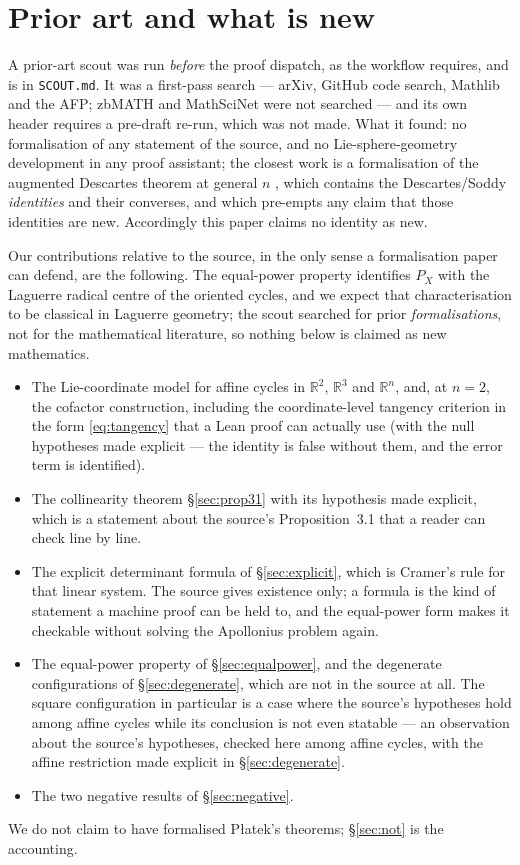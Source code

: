 \documentclass[11pt]{article}
\theoremstyle{definition}
\theoremstyle{remark}
\newcommand{\RR}{\mathbb{R}}
\begin{document}
\section{Prior art and what is new}\label{sec:prior}

A prior-art scout was run \emph{before} the proof dispatch, as the workflow requires, and is in
\texttt{SCOUT.md}. It was a first-pass search --- arXiv, GitHub code search,
Mathlib and the AFP; zbMATH and MathSciNet were not searched --- and its own header requires a
pre-draft re-run, which was not made. What it found: no formalisation of any statement of the source,
and no Lie-sphere-geometry development in any proof assistant; the closest work is a formalisation of
the augmented Descartes theorem at general $n$ \cite{augdescartes}, which contains the
Descartes/Soddy \emph{identities} and their converses, and which pre-empts any claim that those
identities are new. Accordingly this paper claims no identity as new.

Our contributions relative to the source, in the only sense a formalisation paper can defend, are the
following. The equal-power property identifies $P_X$ with the Laguerre radical centre of the oriented
cycles, and we expect that characterisation to be classical in Laguerre geometry; the scout searched
for prior \emph{formalisations}, not for the mathematical literature, so nothing below is claimed as
new mathematics.
\begin{itemize}
\item The Lie-coordinate model for affine cycles in $\RR^2$, $\RR^3$ and $\RR^n$, and, at $n=2$,
the cofactor construction, including the coordinate-level tangency criterion in the form \eqref{eq:tangency} that
a Lean proof can actually use (with the null hypotheses made explicit --- the identity is false
without them, and the error term is identified).
\item The collinearity theorem \S\ref{sec:prop31} with its hypothesis made explicit, which is a
statement about the source's Proposition~3.1 that a reader can check line by line.
\item The explicit determinant formula of \S\ref{sec:explicit}, which is Cramer's rule for that
linear system. The source gives existence only; a formula is the kind of statement a machine proof
can be held to, and the equal-power form makes it checkable without solving the Apollonius problem
again.
\item The equal-power property of \S\ref{sec:equalpower}, and the degenerate configurations of
\S\ref{sec:degenerate}, which are not in the source at all. The square configuration in particular is
a case where the source's hypotheses hold among affine cycles while its conclusion is not even
statable --- an observation about the source's hypotheses, checked here among affine cycles, with the
affine restriction made explicit in \S\ref{sec:degenerate}.
\item The two negative results of \S\ref{sec:negative}.
\end{itemize}
We do not claim to have formalised Płatek's theorems; \S\ref{sec:not} is the accounting.
\end{document}
